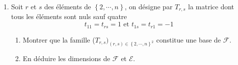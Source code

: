 \begin{enumerate}
\item  Soit $r$ et $s$ des \'{e}l\'{e}ments de $\left\{ 2,\cdots ,n\right\}$, on d\'{e}signe par $T_{r,s}$ la matrice dont tous les \'{e}l\'{e}ments sont nuls sauf quatre 
\[
t_{11}=t_{rs}=1\text{ et }t_{1s}=t_{r1}=-1 
\]

\begin{enumerate}
\item  Montrer que la famille ($T_{r,s})_{(r,s)\in \left\{ 2,\cdots,n\right\} ^{2}}$ constitue une base de $\mathcal{F}$.

\item  En d\'{e}duire les dimensions de $\mathcal{F}$ et $\mathcal{E}$.
\end{enumerate}
\end{enumerate}
